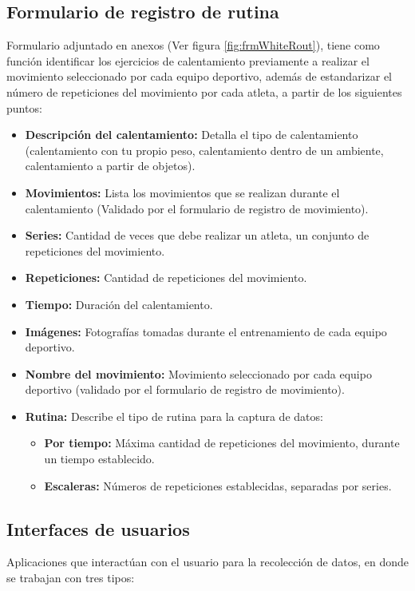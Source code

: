 \subsection{Formulario de registro de rutina} \label{ins:frmRout}
Formulario adjuntado en anexos (Ver figura \ref{fig:frmWhiteRout}), tiene como funci\'on identificar los ejercicios de calentamiento  previamente a realizar el movimiento seleccionado por cada equipo deportivo, adem\'as de estandarizar el n\'umero de repeticiones del movimiento por cada atleta, a partir de los siguientes puntos:
\begin{itemize}
	\item \textbf{Descripci\'on del calentamiento:} Detalla el tipo de calentamiento (calentamiento con tu propio peso, calentamiento dentro de un ambiente, calentamiento a partir de objetos).
	\item \textbf{Movimientos:} Lista los movimientos que se realizan durante el calentamiento (Validado por el formulario de registro de movimiento).
	\item \textbf{Series:} Cantidad de veces que debe realizar un atleta, un conjunto de repeticiones del movimiento.
	\item \textbf{Repeticiones:} Cantidad de repeticiones del movimiento.
	\item \textbf{Tiempo:} Duraci\'on del calentamiento.
	\item \textbf{Im\'agenes:} Fotograf\'ias tomadas durante el entrenamiento de cada equipo deportivo.
	\item \textbf{Nombre del movimiento:} Movimiento seleccionado por cada equipo deportivo  (validado por el formulario de registro de movimiento).
	\item \textbf{Rutina:} Describe el tipo de rutina para la captura de datos:
	\begin{itemize}
		\item \textbf{Por tiempo:} M\'axima cantidad de repeticiones del movimiento, durante un tiempo establecido.
		\item \textbf{Escaleras:} N\'umeros de repeticiones establecidas, separadas por series.
	\end{itemize}	
\end{itemize}
\subsection{Interfaces de usuarios} \label{ins:UI}
Aplicaciones que interact\'uan con el usuario para la recolecci\'on de datos, en donde se trabajan con  tres tipos:
